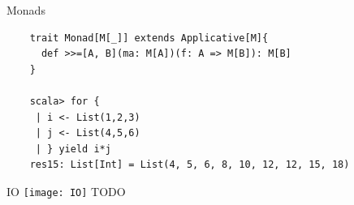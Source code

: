 \documentclass{beamer}
\begin{document}
\begin{frame}[fragile]{Monads}
  \begin{verbatim}
    trait Monad[M[_]] extends Applicative[M]{
      def >>=[A, B](ma: M[A])(f: A => M[B]): M[B]
    }

    scala> for {
     | i <- List(1,2,3)
     | j <- List(4,5,6)
     | } yield i*j
    res15: List[Int] = List(4, 5, 6, 8, 10, 12, 12, 15, 18)

  \end{verbatim}
\end{frame}

\begin{frame}[fragile]{IO}
  \texttt{[image: IO]}
  TODO
\end{frame}
\end{document}
